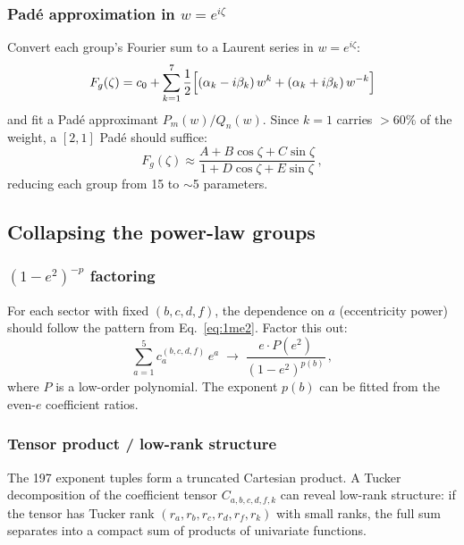 \documentclass[11pt,letterpaper]{article}
\begin{document}
\subsubsection{Pad\'e approximation in $w = e^{i\zeta}$}

Convert each group's Fourier sum to a Laurent series in $w = e^{i\zeta}$:
\begin{equation}
F_g(\zeta) = c_0 + \sum_{k=1}^{7} \frac{1}{2}\Bigl[(\alpha_k - i\beta_k)\,w^k + (\alpha_k + i\beta_k)\,w^{-k}\Bigr]
\end{equation}
and fit a Pad\'e approximant $P_m(w)/Q_n(w)$. Since $k=1$ carries $>60\%$ of the weight, a $[2,1]$ Pad\'e should suffice:
\begin{equation}
F_g(\zeta) \approx \frac{A + B\cos\zeta + C\sin\zeta}{1 + D\cos\zeta + E\sin\zeta}\,,
\end{equation}
reducing each group from 15 to $\sim$5 parameters.

\subsection{Collapsing the power-law groups}

\subsubsection{$(1-e^2)^{-p}$ factoring}

For each sector with fixed $(b, c, d, f)$, the dependence on $a$ (eccentricity power) should follow the pattern from Eq.~\eqref{eq:1me2}. Factor this out:
\begin{equation}
\sum_{a=1}^{5} c_a^{(b,c,d,f)}\, e^a \;\longrightarrow\; \frac{e \cdot P(e^2)}{(1 - e^2)^{p(b)}}\,,
\label{eq:efactor}
\end{equation}
where $P$ is a low-order polynomial. The exponent $p(b)$ can be fitted from the even-$e$ coefficient ratios.

\subsubsection{Tensor product / low-rank structure}

The 197 exponent tuples form a truncated Cartesian product. A Tucker decomposition of the coefficient tensor $C_{a,b,c,d,f,k}$ can reveal low-rank structure: if the tensor has Tucker rank $(r_a, r_b, r_c, r_d, r_f, r_k)$ with small ranks, the full sum separates into a compact sum of products of univariate functions.
\end{document}
